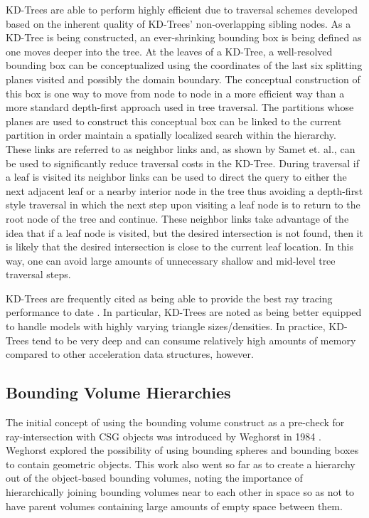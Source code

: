 KD-Trees are able to perform highly efficient due to traversal schemes developed
based on the inherent quality of KD-Trees' non-overlapping sibling nodes. As a
KD-Tree is being constructed, an ever-shrinking bounding box is being defined as
one moves deeper into the tree. At the leaves of a KD-Tree, a well-resolved
bounding box can be conceptualized using the coordinates of the last six
splitting planes visited and possibly the domain boundary. The conceptual
construction of this box is one way to move from node to node in a more
efficient way than a more standard depth-first approach used in tree
traversal. The partitions whose planes are used to construct this conceptual box
can be linked to the current partition in order maintain a spatially localized
search within the hierarchy. These links are referred to as neighbor links and,
as shown by Samet et. al.\cite{Samet_1989}, can be used to significantly reduce
traversal costs in the KD-Tree. During traversal if a leaf is visited its
neighbor links can be used to direct the query to either the next adjacent leaf
or a nearby interior node in the tree thus avoiding a depth-first style
traversal in which the next step upon visiting a leaf node is to return to the
root node of the tree and continue. These neighbor links take advantage of the
idea that if a leaf node is visited, but the desired intersection is not found,
then it is likely that the desired intersection is close to the current leaf
location. In this way, one can avoid large amounts of unnecessary shallow and
mid-level tree traversal steps.

KD-Trees are frequently cited as being able to provide the best ray tracing
performance to date \cite{Ernst_2007,Hurley_2002,Havran_2000}. In particular,
KD-Trees are noted as being better equipped to handle models with highly varying
triangle sizes/densities. In practice, KD-Trees tend to be very deep and can
consume relatively high amounts of memory compared to other acceleration data
structures, however. 

\subsection{Bounding Volume Hierarchies}%
\label{subsec:BVH}
The initial concept of using the bounding volume construct as a pre-check for
ray-intersection with CSG objects was introduced by Weghorst in 1984
\cite{Weghorst_1984}. Weghorst explored the possibility of using bounding
spheres and bounding boxes to contain geometric objects. This work also went so
far as to create a hierarchy out of the object-based bounding volumes, noting the
importance of hierarchically joining bounding volumes near to each other in space
so as not to have parent volumes containing large amounts of empty space between them.

